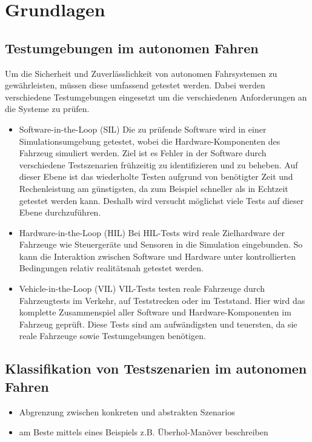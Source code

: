\chapter{Grundlagen}

\section{Testumgebungen im autonomen Fahren}
Um die Sicherheit und Zuverlässlichkeit von autonomen Fahrsystemen zu gewährleisten, müssen diese umfassend getestet werden. 
Dabei werden verschiedene Testumgebungen eingesetzt um die verschiedenen Anforderungen an die Systeme zu prüfen. 

\begin{itemize}
    \item Software-in-the-Loop (SIL) \newline
            Die zu prüfende Software wird in einer Simulationsumgebung getestet, wobei die Hardware-Komponenten des Fahrzeug simuliert werden. 
            Ziel ist es Fehler in der Software durch verschiedene Testszenarien frühzeitig zu identifizieren und zu beheben.
            Auf dieser Ebene ist das wiederholte Testen aufgrund von benötigter Zeit und Rechenleistung am günstigsten, da zum Beispiel schneller als in Echtzeit getestet werden kann. 
            Deshalb wird versucht möglichst viele Tests auf dieser Ebene durchzuführen.
    \item Hardware-in-the-Loop (HIL) \newline
            Bei HIL-Tests wird reale Zielhardware der Fahrzeuge wie Steuergeräte und Sensoren in die Simulation eingebunden. 
            So kann die Interaktion zwischen Software und Hardware unter kontrollierten Bedingungen relativ realitätsnah getestet werden.
    \item Vehicle-in-the-Loop (VIL) \newline
            VIL-Tests testen reale Fahrzeuge durch Fahrzeugtests im Verkehr, auf Teststrecken oder im Teststand. 
            Hier wird das komplette Zusammenspiel aller Software und Hardware-Komponenten im Fahrzeug geprüft.
            Diese Tests sind am aufwändigsten und teuersten, da sie reale Fahrzeuge sowie Testumgebungen benötigen.
\end{itemize}
\section{Klassifikation von Testszenarien im autonomen Fahren}
\begin{itemize}
    \item Abgrenzung zwischen konkreten und abstrakten Szenarios
    \item am Beste mittels eines Beispiels z.B. Überhol-Manöver beschreiben
\end{itemize}
